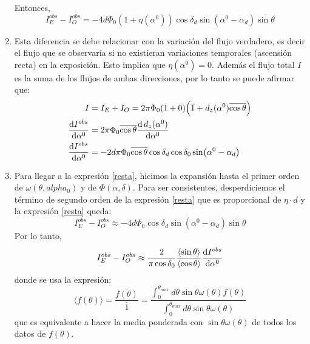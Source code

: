 \begin{enumerate}
     Entonces,
    \begin{equation}
        I^{obs}_E -  I^{obs}_O =-4d \Phi_0 (1+ \eta(\alpha^0)) \cos\delta_d \sin(\alpha^0  - \alpha_d)\overline{\sin\theta}
        \label{resta}
    \end{equation}
    \item Esta diferencia se debe relacionar con la variación del flujo verdadero, es decir el flujo que se observaría si no existieran variaciones temporales (ascensión recta) en la exposición. Esto implica que $\eta(\alpha^0)=0$.  Además el flujo total $I$ es la suma de los flujos de ambas direcciones, por lo tanto se puede afirmar que:
    \begin{align}
        I&=I_E +  I_O = 2\pi\Phi_0 (1+ 0) \Big( \overline{1} + d_z(\alpha^0)\overline{\cos\theta}  \Big)\\
        \dv{I^{obs}}{\alpha^0}  & = 2\pi\Phi_0 \overline{\cos\theta} \dv{\,d_z(\alpha^0) }{\alpha^0}\\ 
        \dv{I^{obs}}{\alpha^0} &= -2d\pi\Phi_0 \overline{\cos\theta}\cos\delta_d \cos\delta_0 \sin(\alpha^0 - \alpha_d) \label{total_flux}
    \end{align}

    \item Para llegar a la expresión \ref{resta}, hicimos la expansión hasta el primer orden de $\omega(\theta, alpha_0)$ y de $\Phi(\alpha, \delta)$. Para ser consistentes, desperdiciemos el término de segundo orden de la expresión \ref{resta} que es proporcional de $\eta \cdot d$ y la expresión \ref{resta} queda:
        \begin{equation}
            I^{obs}_E -  I^{obs}_O \approx -4d \Phi_0 \cos\delta_d \sin(\alpha^0  - \alpha_d)\overline{\sin\theta}
            \label{resta_final}
        \end{equation}
    Por lo tanto,
    \begin{equation}
        I^{obs}_E -  I^{obs}_O \approx  \frac{2}{\pi \cos \delta_0} \frac{\langle\sin\theta \rangle}{\langle\cos\theta \rangle}\dv{I^{obs}}{\alpha^0}
        \label{eq:final}
    \end{equation}
    donde se usa la expresión:
    \begin{equation*}
        \langle f(\theta) \rangle = \frac{\overline{f(\theta)}}{\overline{1}} = \displaystyle\frac{\int_{0}^{\theta_{max}} d \theta \sin\theta \omega(\theta) f(\theta) }{\int_{0}^{\theta_{max}} d \theta \sin\theta \omega(\theta)} 
    \end{equation*}
    que es equivalente a hacer la media ponderada con $\sin\theta\omega(\theta)$ de todos los datos de $f(\theta)$. %
\end{enumerate}

